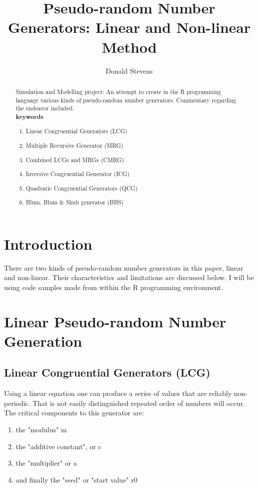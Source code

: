 \documentclass[a4paper]{article}
\title{Pseudo-random Number Generators: Linear and Non-linear Method}
\author{Donald Stevens}
\begin{document}
\maketitle

\begin{abstract}
Simulation and Modelling project: An attempt to create in the R programming language various kinds of pseudo-random number generators. Commentary regarding the endeavor included.\\

\noindent \textbf {keywords}
\begin {enumerate}
	\item Linear Congruential Generators (LCG)\\
	\item Multiple Recursive Generator (MRG)\\
	\item Combined LCGs and MRGs (CMRG)\\
	\item Inversive Congruential Generator (ICG)\\
	\item Quadratic Congruential Generators (QCG)\\
	\item Blum, Blum \& Shub generator (BBS)\\
\end {enumerate}
\end{abstract}

\section{Introduction}

There are two kinds of pseudo-random number generators in this paper, linear and non-linear. Their characteristics and limitations are discussed below. I will be using code samples made from within the R programming environment.

\section{Linear Pseudo-random Number Generation}
\label{sec:examples}

\subsection{Linear Congruential Generators (LCG)}

Using a linear equation one can produce a series of values that are reliably non-periodic. That is not easily distinguished repeated order of numbers will occur. The critical components to this generator are:
\begin{enumerate}
\item the "modulus" m
\item the "additive constant", or  c
\item the "multiplier" or a
\item and finally the "seed" or "start value" r0
\end{enumerate}
\end{document}
